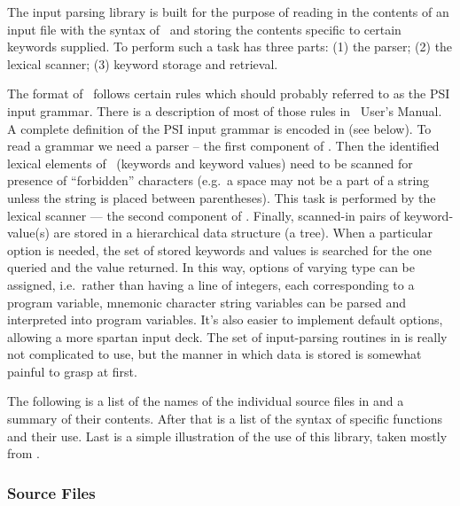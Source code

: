 %
%
%
%
%
The input parsing library is built for the purpose of reading in the
contents of an input file with the syntax of \ and storing
the contents specific to certain keywords supplied. To perform such a
task  has three parts: (1) the parser; (2) the
lexical scanner; (3) keyword storage and retrieval.

The format of \ follows certain rules which should probably
referred to as the PSI input grammar. There is a description of most
of those rules in \PSIthree\ User's Manual. A complete definition of
the PSI input grammar is encoded in  (see below).  To
read a grammar we need a parser -- the first component of
. Then the identified lexical elements of
\ (keywords and keyword values) need to be scanned for
presence of ``forbidden'' characters (e.g.\ a space may not be a part
of a string unless the string is placed between parentheses).  This
task is performed by the lexical scanner --- the second component of
. Finally, scanned-in pairs of keyword-value(s) are
stored in a hierarchical data structure (a tree). When a particular
option is needed, the set of stored keywords and values is searched
for the one queried and the value returned.  In this way, options of
varying type can be assigned, i.e.\ rather than having a line of
integers, each corresponding to a program variable, mnemonic character
string variables can be parsed and interpreted into program variables.
It's also easier to implement default options, allowing a more spartan
input deck.  The set of input-parsing routines in 
is really not complicated to use, but the manner in which data is
stored is somewhat painful to grasp at first.

The following is a list of the names of the individual source files in
 and a summary of their contents.  After that is a
list of the syntax of specific functions and their use.  Last is a
simple illustration of the use of this library, taken mostly from
\PSIcscf.

\subsubsection{Source Files}

